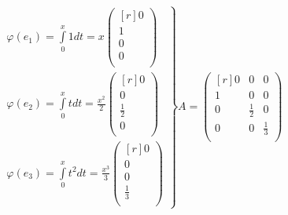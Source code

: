 $$
\left.
\begin{aligned}
\varphi (e_1)=\int\limits^x_0 1 dt=x
\left(
\begin{smallmatrix*}[r]
0\\ 1\\ 0\\ 0\\
\end{smallmatrix*}
\right) \\
\varphi (e_2)=\int\limits^x_0 t dt=\frac{x^2}{2}
\left(
\begin{smallmatrix*}[r]
0\\ 0\\ \frac{1}{2}\\ 0\\
\end{smallmatrix*}
\right) \\
\varphi (e_3)=\int\limits^x_0 t^2 dt=\frac{x^3}{3}
\left(
\begin{smallmatrix*}[r]
0\\ 0\\  0\\ \frac{1}{3}\\
\end{smallmatrix*}
\right) 
\end{aligned}
\right\}
A=
\begin{pmatrix*}[r]
0 & 0 & 0\\
1 & 0 & 0\\
0 & \frac{1}{2} & 0\\
0 & 0 & \frac{1}{3}\\
\end{pmatrix*}
$$





